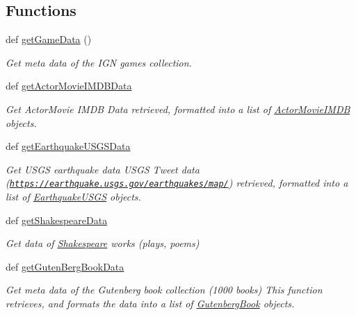 \subsection*{Functions}
\begin{DoxyCompactItemize}
\item 
def \hyperlink{namespace_bridges_1_1data__src__dependent_1_1_data_source_aeebc336dcbfcfa0b0be26fefa4d08b2f}{get\+Game\+Data} ()
\begin{DoxyCompactList}\small\item\em Get meta data of the I\+G\+N games collection. \end{DoxyCompactList}\item 
def \hyperlink{namespace_bridges_1_1data__src__dependent_1_1_data_source_a4b05b4b6596a7ae801f97ea786a497f8}{get\+Actor\+Movie\+I\+M\+D\+B\+Data}
\begin{DoxyCompactList}\small\item\em Get Actor\+Movie I\+M\+D\+B Data retrieved, formatted into a list of \hyperlink{namespace_bridges_1_1data__src__dependent_1_1_actor_movie_i_m_d_b}{Actor\+Movie\+I\+M\+D\+B} objects. \end{DoxyCompactList}\item 
def \hyperlink{namespace_bridges_1_1data__src__dependent_1_1_data_source_a1bb4b0529dfc73426d83352107db79fd}{get\+Earthquake\+U\+S\+G\+S\+Data}
\begin{DoxyCompactList}\small\item\em Get U\+S\+G\+S earthquake data U\+S\+G\+S Tweet data (\href{https://earthquake.usgs.gov/earthquakes/map/}{\tt https\+://earthquake.\+usgs.\+gov/earthquakes/map/}) retrieved, formatted into a list of \hyperlink{namespace_bridges_1_1data__src__dependent_1_1_earthquake_u_s_g_s}{Earthquake\+U\+S\+G\+S} objects. \end{DoxyCompactList}\item 
def \hyperlink{namespace_bridges_1_1data__src__dependent_1_1_data_source_ad6108d51c5758d2b2b7b7716319a0110}{get\+Shakespeare\+Data}
\begin{DoxyCompactList}\small\item\em Get data of \hyperlink{namespace_bridges_1_1data__src__dependent_1_1_shakespeare}{Shakespeare} works (plays, poems) \end{DoxyCompactList}\item 
def \hyperlink{namespace_bridges_1_1data__src__dependent_1_1_data_source_a8444828d16fc09c506364236c8d61bc9}{get\+Guten\+Berg\+Book\+Data}
\begin{DoxyCompactList}\small\item\em Get meta data of the Gutenberg book collection (1000 books) This function retrieves, and formats the data into a list of \hyperlink{namespace_bridges_1_1data__src__dependent_1_1_gutenberg_book}{Gutenberg\+Book} objects. \end{DoxyCompactList}\item 

\end{DoxyCompactItemize}
